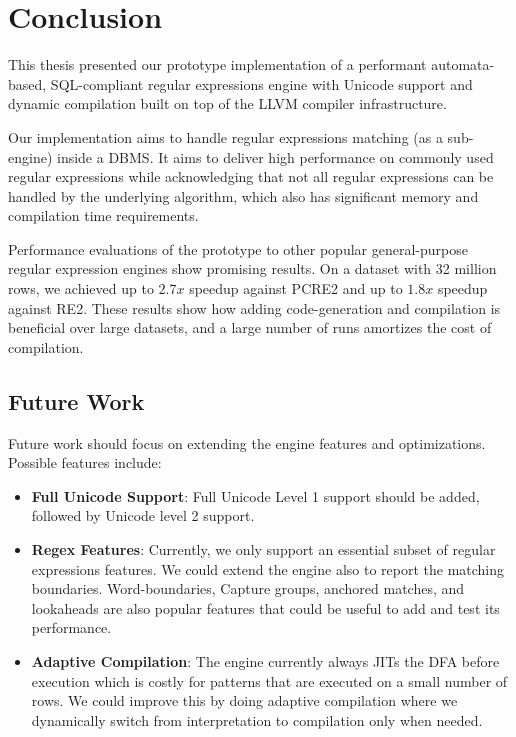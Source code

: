 \chapter{Conclusion}\label{chapter:conclusion}
This thesis presented our prototype implementation of a performant automata-based, SQL-compliant regular expressions engine with Unicode support and dynamic compilation built on top of the LLVM compiler infrastructure.

Our implementation aims to handle regular expressions matching (as a sub-engine) inside a DBMS. It aims to deliver high performance on commonly used regular expressions while acknowledging that not all regular expressions can be handled by the underlying algorithm, which also has significant memory and compilation time requirements.

Performance evaluations of the prototype to other popular general-purpose regular expression engines show promising results. On a dataset with 32 million rows, we achieved up to $2.7x$ speedup against PCRE2 and up to $1.8x$ speedup against RE2. These results show how adding code-generation and compilation is beneficial over large datasets, and a large number of runs amortizes the cost of compilation.

\section{Future Work}\label{futurework}

Future work should focus on extending the engine features and optimizations. Possible features include:
\begin{itemize}
    \item \textbf{Full Unicode Support}: Full Unicode Level 1 support should be added, followed by Unicode level 2 support.
    \item \textbf{Regex Features}: Currently, we only support an essential subset of regular expressions features. We could extend the engine also to report the matching boundaries. Word-boundaries, Capture groups, anchored matches, and lookaheads are also popular features that could be useful to add and test its performance.  
    \item \textbf{Adaptive Compilation}: The engine currently always JITs the DFA before execution which is costly for patterns that are executed on a small number of rows. We could improve this by doing adaptive compilation where we dynamically switch from interpretation to compilation only when needed.
\end{itemize}

